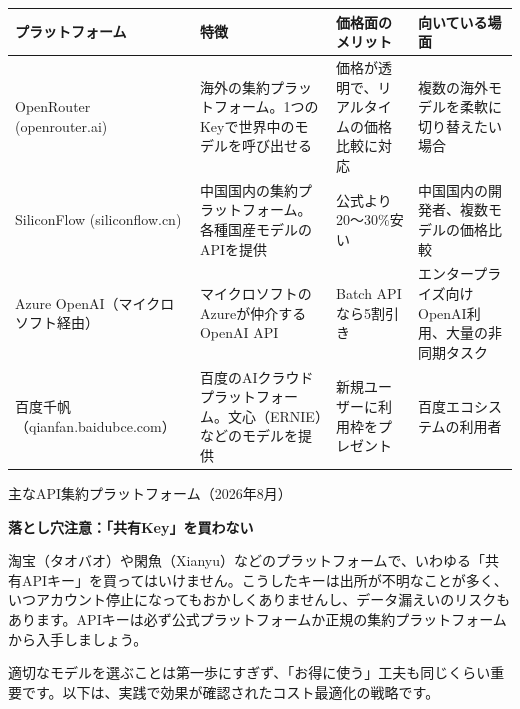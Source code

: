 \begin{center}
\begin{tabularx}{\linewidth}{|X|X|X|X|}
\hline
\textbf{プラットフォーム} & \textbf{特徴} & \textbf{価格面のメリット} & \textbf{向いている場面} \tabularnewline
\hline
OpenRouter (openrouter.ai) & 海外の集約プラットフォーム。1つのKeyで世界中のモデルを呼び出せる & 価格が透明で、リアルタイムの価格比較に対応 & 複数の海外モデルを柔軟に切り替えたい場合 \tabularnewline
SiliconFlow (siliconflow.cn) & 中国国内の集約プラットフォーム。各種国産モデルのAPIを提供 & 公式より20〜30\%安い & 中国国内の開発者、複数モデルの価格比較 \tabularnewline
Azure OpenAI（マイクロソフト経由） & マイクロソフトのAzureが仲介するOpenAI API & Batch APIなら5割引き & エンタープライズ向けOpenAI利用、大量の非同期タスク \tabularnewline
百度千帆（qianfan.baidubce.com） & 百度のAIクラウドプラットフォーム。文心（ERNIE）などのモデルを提供 & 新規ユーザーに利用枠をプレゼント & 百度エコシステムの利用者 \tabularnewline
\hline
\end{tabularx}
\end{center}

\begin{center}\small\color{gray}主なAPI集約プラットフォーム（2026年8月）\end{center}

\textbf{落とし穴注意：「共有Key」を買わない}\par

淘宝（タオバオ）や閑魚（Xianyu）などのプラットフォームで、いわゆる「共有APIキー」を買ってはいけません。こうしたキーは出所が不明なことが多く、いつアカウント停止になってもおかしくありませんし、データ漏えいのリスクもあります。APIキーは必ず公式プラットフォームか正規の集約プラットフォームから入手しましょう。


適切なモデルを選ぶことは第一歩にすぎず、「お得に使う」工夫も同じくらい重要です。以下は、実践で効果が確認されたコスト最適化の戦略です。

